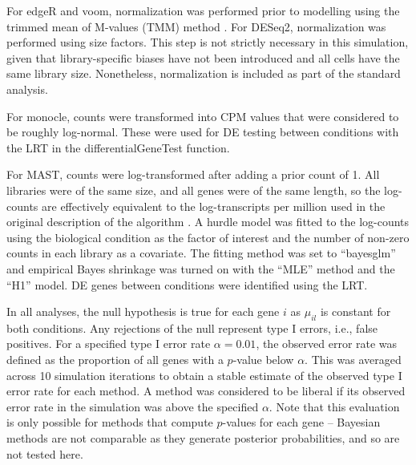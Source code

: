 \documentclass{article}
\begin{document}
For edgeR and voom, normalization was performed prior to modelling using the trimmed mean of M-values (TMM) method \cite{robinson2010scaling}.
For DESeq2, normalization was performed using size factors.
This step is not strictly necessary in this simulation, given that library-specific biases have not been introduced and all cells have the same library size.
Nonetheless, normalization is included as part of the standard analysis.

For monocle, counts were transformed into CPM values that were considered to be roughly log-normal.
These were used for DE testing between conditions with the LRT in the differentialGeneTest function.

For MAST, counts were log-transformed after adding a prior count of 1.
All libraries were of the same size, and all genes were of the same length, 
    so the log-counts are effectively equivalent to the log-transcripts per million used in the original description of the algorithm \cite{finak2015mast}.
A hurdle model was fitted to the log-counts using the biological condition as the factor of interest and the number of non-zero counts in each library as a covariate.
The fitting method was set to ``bayesglm'' and empirical Bayes shrinkage was turned on with the ``MLE'' method and the ``H1'' model.
DE genes between conditions were identified using the LRT.

In all analyses, the null hypothesis is true for each gene $i$ as $\mu_{il}$ is constant for both conditions.
Any rejections of the null represent type I errors, i.e., false positives.
For a specified type I error rate $\alpha = 0.01$, the observed error rate was defined as the proportion of all genes with a $p$-value below $\alpha$.
This was averaged across 10 simulation iterations to obtain a stable estimate of the observed type I error rate for each method. 
A method was considered to be liberal if its observed error rate in the simulation was above the specified $\alpha$.
Note that this evaluation is only possible for methods that compute $p$-values for each gene -- 
    Bayesian methods \cite{vallejos2015basics,kharchenko2014bayesian} are not comparable as they generate posterior probabilities, and so are not tested here.

\end{document}
